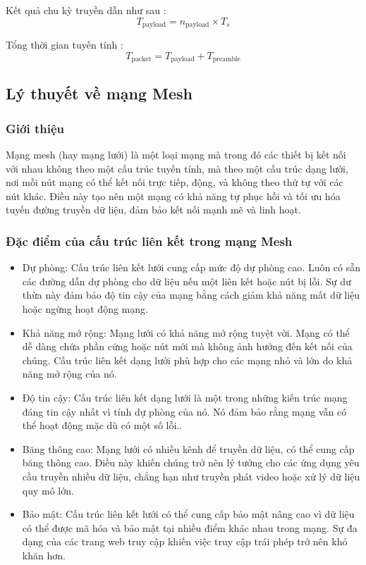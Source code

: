\documentclass{article} %
\begin{document}
	Kết quả chu kỳ truyền dẫn như sau :
	\begin{equation}
		T_{\text{payload}}=n_{\text{payload}} \times T_s
	\end{equation}
	
	Tổng thời gian tuyến tính : 
	\begin{equation}
		T_{\text{packet}}=T_{\text{payload}} + T_{\text{preamble}}
	\end{equation}
	
	
	\subsection{Lý thuyết về mạng Mesh }
	\subsubsection{Giới thiệu}
	
	Mạng mesh (hay mạng lưới) là một loại mạng mà trong đó các thiết bị kết nối với nhau không theo một cấu trúc tuyến tính, mà theo một cấu trúc dạng lưới, nơi mỗi nút mạng có thể kết nối trực tiếp, động, và không theo thứ tự với các nút khác. Điều này tạo nên một mạng có khả năng tự phục hồi và tối ưu hóa tuyến đường truyền dữ liệu, đảm bảo kết nối mạnh mẽ và linh hoạt.
	
	\subsubsection{Đặc điểm của cấu trúc liên kết trong mạng Mesh}
	\begin{itemize}
		\item Dự phòng: Cấu trúc liên kết lưới cung cấp mức độ dự phòng cao. Luôn có sẵn các đường dẫn dự phòng cho dữ liệu nếu một liên kết hoặc nút bị lỗi. Sự dư thừa này đảm bảo độ tin cậy của mạng bằng cách giảm khả năng mất dữ liệu hoặc ngừng hoạt động mạng.
		\item Khả năng mở rộng: Mạng lưới có khả năng mở rộng tuyệt vời. Mạng có thể dễ dàng chứa phần cứng hoặc nút mới mà không ảnh hưởng đến kết nối của chúng. Cấu trúc liên kết dạng lưới phù hợp cho các mạng nhỏ và lớn do khả năng mở rộng của nó.
		\item Độ tin cậy: Cấu trúc liên kết dạng lưới là một trong những kiến trúc mạng đáng tin cậy nhất vì tính dự phòng của nó. Nó đảm bảo rằng mạng vẫn có thể hoạt động mặc dù có một số lỗi..
		\item Băng thông cao: Mạng lưới có nhiều kênh để truyền dữ liệu, có thể cung cấp băng thông cao. Điều này khiến chúng trở nên lý tưởng cho các ứng dụng yêu cầu truyền nhiều dữ liệu, chẳng hạn như truyền phát video hoặc xử lý dữ liệu quy mô lớn.
		\item Bảo mật: Cấu trúc liên kết lưới có thể cung cấp bảo mật nâng cao vì dữ liệu có thể được mã hóa và bảo mật tại nhiều điểm khác nhau trong mạng. Sự đa dạng của các trang web truy cập khiến việc truy cập trái phép trở nên khó khăn hơn.
	\end{itemize}
	
\end{document}
